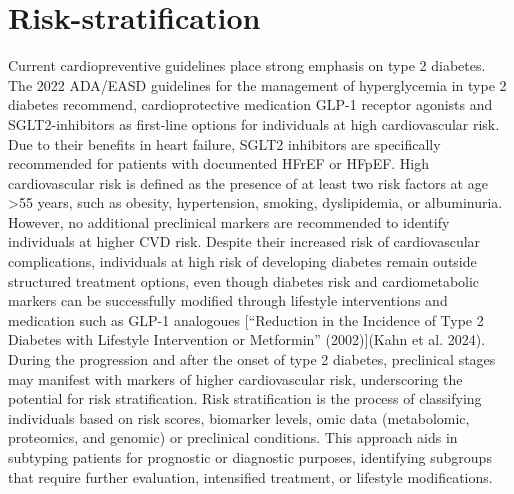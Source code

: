 \documentclass[
  a4paper,
  headsepline=true,
  open=any]{scrbook}
\begin{document}
\hypertarget{risk-stratification}{%
\section{Risk-stratification}\label{risk-stratification}}

Current cardiopreventive guidelines place strong emphasis on type 2
diabetes. The 2022 ADA/EASD guidelines for the management of
hyperglycemia in type 2 diabetes recommend, cardioprotective medication
GLP-1 receptor agonists and SGLT2-inhibitors as first-line options for
individuals at high cardiovascular risk. Due to their benefits in heart
failure, SGLT2 inhibitors are specifically recommended for patients with
documented HFrEF or HFpEF. High cardiovascular risk is defined as the
presence of at least two risk factors at age \textgreater55 years, such
as obesity, hypertension, smoking, dyslipidemia, or albuminuria.
However, no additional preclinical markers are recommended to identify
individuals at higher CVD risk. Despite their increased risk of
cardiovascular complications, individuals at high risk of developing
diabetes remain outside structured treatment options, even though
diabetes risk and cardiometabolic markers can be successfully modified
through lifestyle interventions and medication such as GLP-1 analogoues
{[}{``Reduction in the Incidence of Type 2 Diabetes with Lifestyle
Intervention or Metformin''} (2002){]}(Kahn et al. 2024). During the
progression and after the onset of type 2 diabetes, preclinical stages
may manifest with markers of higher cardiovascular risk, underscoring
the potential for risk stratification. Risk stratification is the
process of classifying individuals based on risk scores, biomarker
levels, omic data (metabolomic, proteomics, and genomic) or preclinical
conditions. This approach aids in subtyping patients for prognostic or
diagnostic purposes, identifying subgroups that require further
evaluation, intensified treatment, or lifestyle modifications.
\end{document}
